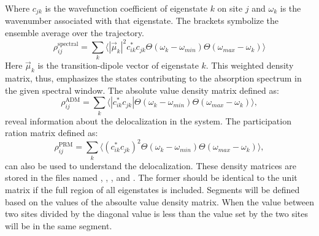 Where $c_{jk}$ is the wavefunction coefficient of eigenstate $k$ on site $j$ and 
$\omega_k$ is the wavenumber associated with that eigenstate.
The brackets symbolize the ensemble average over the trajectory.
\begin{equation}
\rho^{\textrm{spectral}}_{ij}=\sum_k \Big\langle |\vec{\mu}_k|^2 c_{ik}^* c_{jk}  \Theta(\omega_{k}-\omega_{min})\Theta(\omega_{max}-\omega_k)\Big\rangle
\end{equation}
Here $\vec{\mu}_k$ is the transition-dipole vector of eigenstate $k$.
This weighted density matrix, thus, emphasizes the states contributing to the
absorption spectrum in the given spectral window.
The absolute value density matrix defined as:
\begin{equation}
	\rho^{\textrm{ADM}}_{ij}=\sum_k \Big\langle |c_{ik}^* c_{jk}|  \Theta(\omega_{k}-\omega_{min})\Theta(\omega_{max}-\omega_k)\Big\rangle,
\end{equation}
reveal information about the delocalization in the system.
The participation ration matrix defined as:
\begin{equation}
	\rho^{\textrm{PRM}}_{ij}=\sum_k \Big\langle (c_{ik}^* c_{jk})^2  \Theta(\omega_{k}-\omega_{min})\Theta(\omega_{max}-\omega_k)\Big\rangle,
\end{equation}
can also be used to understand the delocalization.
These density matrices are stored in the files named ,
, , and
. The former should be identical to the unit matrix
if the full region of all eigenstates is included. Segments will be defined based on
the values of the absoulte value density matrix. When the value between two sites
divided by the diagonal value is less than the value set by  the two
sites will be in the same segment. 

